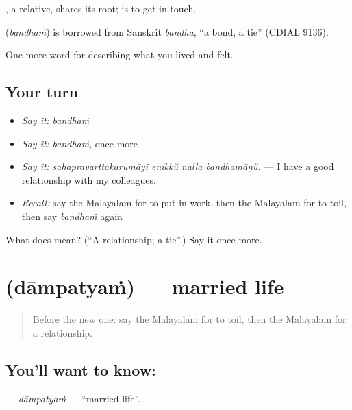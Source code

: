 , a relative, shares its root;  is to get in touch.

\begin{cousinweb}
\textbf{} (\emph{bandhaṁ}) is borrowed from Sanskrit \emph{bandha}, \textquotedblleft{}a bond, a tie\textquotedblright{} (CDIAL 9136).
\end{cousinweb}

\begin{grammarlens}[title={What you've built}]
One more word for describing what you lived and felt.
\end{grammarlens}

\subsection*{Your turn}
\begin{itemize}
\raggedright
  \item \emph{Say it:} \emph{bandhaṁ}
  \item \emph{Say it:} \emph{bandhaṁ}, once more
  \item \emph{Say it:} \emph{sahapravarttakarumāyi enikkŭ nalla bandhamāṇŭ.} — I have a good relationship with my colleagues.
  \item \emph{Recall:} say the Malayalam for to put in work, then the Malayalam for to toil, then say \emph{bandhaṁ} again
\end{itemize}

\begin{tcolorbox}[breakable,colback=teal!4,colframe=teal!35!black,title={Before you move on}]
What does  mean? (\textquotedblleft{}A relationship; a tie\textquotedblright{}.) Say it once more.
\end{tcolorbox}
\section[\texorpdfstring{\ml{ദാമ്പത്യം} (dāmpatyaṁ)}{ദാമ്പത്യം (dāmpatyaṁ)}]{ (dāmpatyaṁ) — married life}

\label{lesson:ML-C552-dampatyam}



\begin{quote}
Before the new one: say the Malayalam for to toil, then the Malayalam for a relationship.
\end{quote}

\subsection*{You'll want to know: }
\textbf{} — \emph{dāmpatyaṁ} — \textquotedblleft{}married life\textquotedblright{}.

